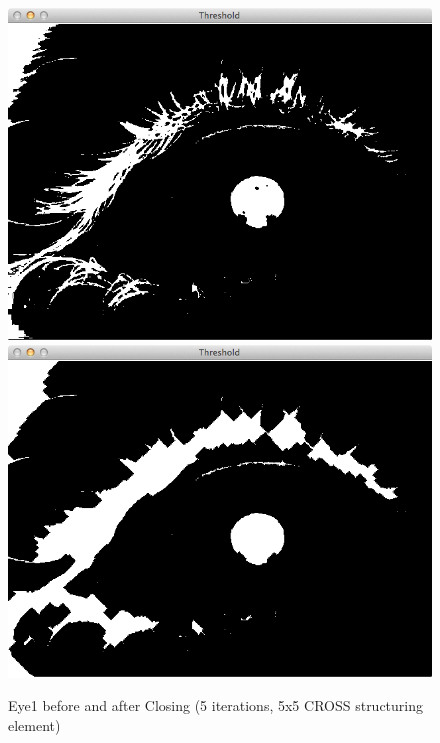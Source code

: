\documentclass[a4paper,11pt]{article}
\begin{document}
\begin{figure}[ht]
  \centering
  \includegraphics[scale=0.2]{eye1_close_5}
  \includegraphics[scale=0.2]{eye1_no_morph}
  \caption{Eye1 before and after Closing (5 iterations, 5x5 CROSS structuring element)}
  \label{fig:morph}
\end{figure}
\end{document}
